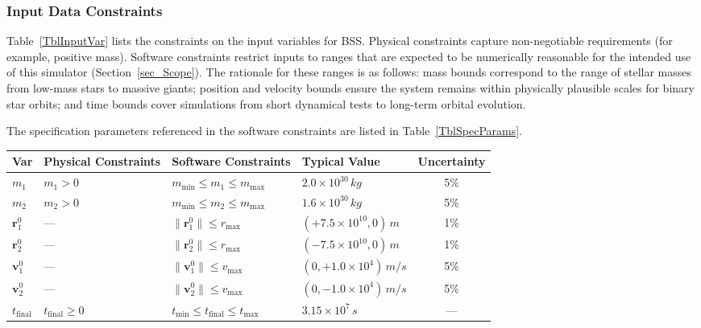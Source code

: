 \documentclass[12pt]{article}
\begin{document}
\subsubsection{Input Data Constraints} \label{sec_DataConstraints}    

Table~\ref{TblInputVar} lists the constraints on the input variables for BSS.
Physical constraints capture non-negotiable requirements (for example, positive
mass). Software constraints restrict inputs to ranges that are expected to be
numerically reasonable for the intended use of this simulator
(Section~\ref{sec_Scope}). The rationale for these ranges is as follows: mass
bounds correspond to the range of stellar masses from low-mass stars to massive
giants; position and velocity bounds ensure the system remains within physically
plausible scales for binary star orbits; and time bounds cover simulations from
short dynamical tests to long-term orbital evolution.

The specification parameters referenced in the software constraints are listed
in Table~\ref{TblSpecParams}.

\begin{table}[!h]
  \caption{Input Variables} \label{TblInputVar}
  \renewcommand{\arraystretch}{1.2}
\noindent \begin{longtable*}{l l l l c}
  \toprule
  \textbf{Var} & \textbf{Physical Constraints} & \textbf{Software Constraints} &
                             \textbf{Typical Value} & \textbf{Uncertainty}\\
  \midrule
  $m_1$ & $m_1 > 0$ & $m_{\min} \le m_1 \le m_{\max}$ & $2.0\times 10^{30}\,\si{kg}$ & 5\% \\
  $m_2$ & $m_2 > 0$ & $m_{\min} \le m_2 \le m_{\max}$ & $1.6\times 10^{30}\,\si{kg}$ & 5\% \\
  $\mathbf{r}_1^0$ & --- & $\lVert \mathbf{r}_1^0 \rVert \le r_{\max}$ & $(+7.5\times 10^{10},0)\,\si{m}$ & 1\% \\
  $\mathbf{r}_2^0$ & --- & $\lVert \mathbf{r}_2^0 \rVert \le r_{\max}$ & $(-7.5\times 10^{10},0)\,\si{m}$ & 1\% \\
  $\mathbf{v}_1^0$ & --- & $\lVert \mathbf{v}_1^0 \rVert \le v_{\max}$ & $(0,+1.0\times 10^{4})\,\si{m\per s}$ & 5\% \\
  $\mathbf{v}_2^0$ & --- & $\lVert \mathbf{v}_2^0 \rVert \le v_{\max}$ & $(0,-1.0\times 10^{4})\,\si{m\per s}$ & 5\% \\
  $t_{\text{final}}$ & $t_{\text{final}} \ge 0$ & $t_{\min} \le t_{\text{final}} \le t_{\max}$ & $3.15\times 10^{7}\,\si{s}$ & --- \\
  \bottomrule
\end{longtable*}
\end{table}
\end{document}
